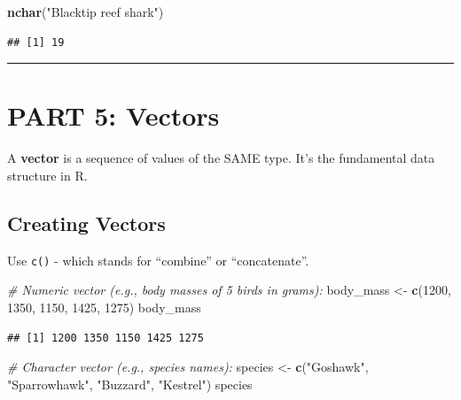 \documentclass[
]{article}
\newenvironment{Shaded}{\begin{snugshade}}{\end{snugshade}}
\newcommand{\CommentTok}[1]{\textcolor[rgb]{0.56,0.35,0.01}{\textit{#1}}}
\newcommand{\DecValTok}[1]{\textcolor[rgb]{0.00,0.00,0.81}{#1}}
\newcommand{\FunctionTok}[1]{\textcolor[rgb]{0.13,0.29,0.53}{\textbf{#1}}}
\newcommand{\NormalTok}[1]{#1}
\newcommand{\OtherTok}[1]{\textcolor[rgb]{0.56,0.35,0.01}{#1}}
\newcommand{\StringTok}[1]{\textcolor[rgb]{0.31,0.60,0.02}{#1}}
\begin{document}
\begin{Shaded}
\begin{Highlighting}[]
\FunctionTok{nchar}\NormalTok{(}\StringTok{"Blacktip reef shark"}\NormalTok{)}
\end{Highlighting}
\end{Shaded}

\begin{verbatim}
## [1] 19
\end{verbatim}

\begin{center}\rule{0.5\linewidth}{0.5pt}\end{center}

\section{PART 5: Vectors}\label{part-5-vectors}

A \textbf{vector} is a sequence of values of the SAME type. It's the
fundamental data structure in R.

\subsection{Creating Vectors}\label{creating-vectors}

Use \texttt{c()} - which stands for ``combine'' or ``concatenate''.

\begin{Shaded}
\begin{Highlighting}[]
\CommentTok{\# Numeric vector (e.g., body masses of 5 birds in grams):}
\NormalTok{body\_mass }\OtherTok{\textless{}{-}} \FunctionTok{c}\NormalTok{(}\DecValTok{1200}\NormalTok{, }\DecValTok{1350}\NormalTok{, }\DecValTok{1150}\NormalTok{, }\DecValTok{1425}\NormalTok{, }\DecValTok{1275}\NormalTok{)}
\NormalTok{body\_mass}
\end{Highlighting}
\end{Shaded}

\begin{verbatim}
## [1] 1200 1350 1150 1425 1275
\end{verbatim}

\begin{Shaded}
\begin{Highlighting}[]
\CommentTok{\# Character vector (e.g., species names):}
\NormalTok{species }\OtherTok{\textless{}{-}} \FunctionTok{c}\NormalTok{(}\StringTok{"Goshawk"}\NormalTok{, }\StringTok{"Sparrowhawk"}\NormalTok{, }\StringTok{"Buzzard"}\NormalTok{, }\StringTok{"Kestrel"}\NormalTok{)}
\NormalTok{species}
\end{Highlighting}
\end{Shaded}
\end{document}
